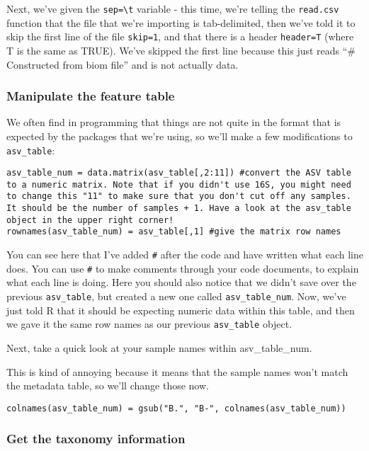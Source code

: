 \documentclass[
]{book}
\begin{document}
Next, we've given the \texttt{sep=\textquotesingle{}\textbackslash{}t\textquotesingle{}} variable - this time, we're telling the \texttt{read.csv} function that the file that we're importing is tab-delimited, then we've told it to skip the first line of the file \texttt{skip=1}, and that there is a header \texttt{header=T} (where T is the same as TRUE). We've skipped the first line because this just reads ``\# Constructed from biom file'' and is not actually data.

\subsubsection{Manipulate the feature table}\label{manipulate-the-feature-table-1}

We often find in programming that things are not quite in the format that is expected by the packages that we're using, so we'll make a few modifications to \texttt{asv\_table}:

\begin{verbatim}
asv_table_num = data.matrix(asv_table[,2:11]) #convert the ASV table to a numeric matrix. Note that if you didn't use 16S, you might need to change this "11" to make sure that you don't cut off any samples. It should be the number of samples + 1. Have a look at the asv_table object in the upper right corner!
rownames(asv_table_num) = asv_table[,1] #give the matrix row names
\end{verbatim}

You can see here that I've added \texttt{\#} after the code and have written what each line does. You can use \texttt{\#} to make comments through your code documents, to explain what each line is doing. Here you should also notice that we didn't save over the previous \texttt{asv\_table}, but created a new one called \texttt{asv\_table\_num}. Now, we've just told R that it should be expecting numeric data within this table, and then we gave it the same row names as our previous \texttt{asv\_table} object.

Next, take a quick look at your sample names within asv\_table\_num.

This is kind of annoying because it means that the sample names won't match the metadata table, so we'll change those now.

\begin{verbatim}
colnames(asv_table_num) = gsub("B.", "B-", colnames(asv_table_num))
\end{verbatim}

\subsubsection{Get the taxonomy information}\label{get-the-taxonomy-information-1}
\end{document}
